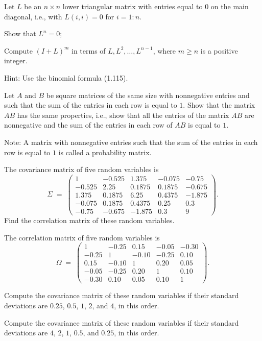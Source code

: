 \begin{exercises}
\item Let $L$ be an $n\times n$ lower triangular matrix with entries equal
to $0$ on the main diagonal, i.e., with $L(i,i)=0$ for $i=1:n$.
\begin{subparts}
\item Show that $L^n = 0$;
\item Compute $(I+L)^m$ in terms of $L, L^2, \ldots, L^{n-1}$, where
$m\ge n$ is a positive integer.
\end{subparts}
\noindent Hint: Use the binomial formula (1.115).

\item Let $A$ and $B$ be square matrices of the same size with
nonnegative entries and such that the sum of the entries in each row is
equal to $1$. Show that the matrix $AB$ has the same properties, i.e.,
show that all the entries of the matrix $AB$ are nonnegative and the sum
of the entries in each row of $AB$ is equal to $1$.

\noindent Note: A matrix with nonnegative entries such that the
sum of the entries in each row is equal to $1$ is called a probability
matrix.

\item The covariance matrix of five random variables is
\[
\Sigma \;=\; \begin{pmatrix}
1 & -0.525 & 1.375 & -0.075 & -0.75 \\
-0.525 & 2.25 & 0.1875 & 0.1875 & -0.675 \\
1.375 & 0.1875 & 6.25 & 0.4375 & -1.875 \\
-0.075 & 0.1875 & 0.4375 & 0.25 & 0.3 \\
-0.75 & -0.675 & -1.875 & 0.3 & 9
\end{pmatrix}.
\]
Find the correlation matrix of these random variables.

\item The correlation matrix of five random variables is
\[
\Omega \;=\; \begin{pmatrix}
1 & -0.25 & 0.15 & -0.05 & -0.30 \\
-0.25 & 1 & -0.10 & -0.25 & 0.10 \\
0.15 & -0.10 & 1 & 0.20 & 0.05 \\
-0.05 & -0.25 & 0.20 & 1 & 0.10 \\
-0.30 & 0.10 & 0.05 & 0.10 & 1
\end{pmatrix}.
\]
\begin{subparts}
\item Compute the covariance matrix of these random variables if their
standard deviations are $0.25$, $0.5$, $1$, $2$, and $4$, in this order.
\item Compute the covariance matrix of these random variables if their
standard deviations are $4$, $2$, $1$, $0.5$, and $0.25$, in this order.
\end{subparts}


\end{exercises}

